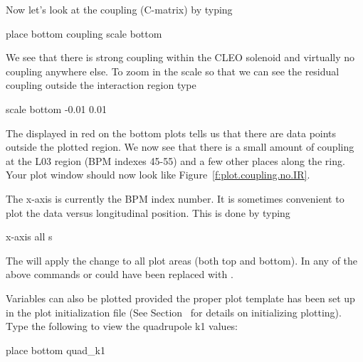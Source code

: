 Now let's look at the coupling (C-matrix) by typing
\begin{example}
  place bottom coupling
  scale bottom
\end{example}
We see that there is strong coupling within the CLEO solenoid and
virtually no coupling anywhere else. To zoom in the scale so that we
can see the residual coupling outside the interaction region type
\begin{example}
  scale bottom -0.01 0.01
\end{example}
The  displayed in red on the bottom plots tells us
that there are data points outside the plotted region.  We now see
that there is a small amount of coupling at the L03 region (BPM
indexes 45-55) and a few other places along the ring. Your plot window
should now look like Figure~\ref{f:plot.coupling.no.IR}.

The x-axis is currently the BPM index number. It is sometimes
convenient to plot the data versus longitudinal position. This is done
by typing
\begin{example}
  x-axis all s
\end{example}

The  will apply the change to all plot areas (both top and
bottom). In any of the above commands  or  could
have been replaced with .

Variables can also be plotted provided the proper plot template has
been set up in the plot initialization file (See
Section~ for details on initializing plotting). Type
the following to view the quadrupole k1 values:
\begin{example}
  place bottom quad_k1
\end{example}

